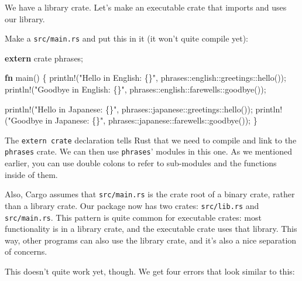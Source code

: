 \documentclass[a4paper,]{book}
\newenvironment{Shaded}{\begin{snugshade}}{\end{snugshade}}
\newcommand{\KeywordTok}[1]{\textcolor[rgb]{0.13,0.29,0.53}{\textbf{{#1}}}}
\newcommand{\StringTok}[1]{\textcolor[rgb]{0.31,0.60,0.02}{{#1}}}
\newcommand{\OtherTok}[1]{\textcolor[rgb]{0.56,0.35,0.01}{{#1}}}
\newcommand{\NormalTok}[1]{{#1}}
\begin{document}
We have a library crate. Let's make an executable crate that imports and
uses our library.

Make a \texttt{src/main.rs} and put this in it (it won't quite compile
yet):

\begin{Shaded}
\begin{Highlighting}[]
\KeywordTok{extern} \NormalTok{crate phrases;}

\KeywordTok{fn} \NormalTok{main() \{}
    \OtherTok{println!}\NormalTok{(}\StringTok{"Hello in English: \{\}"}\NormalTok{, phrases::english::greetings::hello());}
    \OtherTok{println!}\NormalTok{(}\StringTok{"Goodbye in English: \{\}"}\NormalTok{, phrases::english::farewells::goodbye());}

    \OtherTok{println!}\NormalTok{(}\StringTok{"Hello in Japanese: \{\}"}\NormalTok{, phrases::japanese::greetings::hello());}
    \OtherTok{println!}\NormalTok{(}\StringTok{"Goodbye in Japanese: \{\}"}\NormalTok{, phrases::japanese::farewells::goodbye());}
\NormalTok{\}}
\end{Highlighting}
\end{Shaded}

The \texttt{extern\ crate} declaration tells Rust that we need to
compile and link to the \texttt{phrases} crate. We can then use
\texttt{phrases}' modules in this one. As we mentioned earlier, you can
use double colons to refer to sub-modules and the functions inside of
them.

Also, Cargo assumes that \texttt{src/main.rs} is the crate root of a
binary crate, rather than a library crate. Our package now has two
crates: \texttt{src/lib.rs} and \texttt{src/main.rs}. This pattern is
quite common for executable crates: most functionality is in a library
crate, and the executable crate uses that library. This way, other
programs can also use the library crate, and it's also a nice separation
of concerns.

This doesn't quite work yet, though. We get four errors that look
similar to this:
\end{document}

